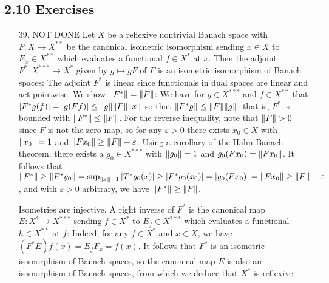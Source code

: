 \documentclass[11pt,leqno]{article}
\theoremstyle{plain}
\theoremstyle{definition}
\numberwithin{equation}{section}
\numberwithin{lem}{section}
\begin{document}
\subsection*{2.10 Exercises}
\begin{enumerate}
  \item[39. NOT DONE] Let $X$ be a reflexive nontrivial Banach space with $F\colon X\to X^{\ast\ast}$ be the canonical isometric isomorphism sending $x\in X$ to $E_x\in X^{\ast\ast}$ which evaluates a functional $f\in X^\ast$ at $x$. Then the adjoint $F^\ast\colon X^{\ast\ast\ast}\to X^\ast$ given by $g\mapsto gF$ of $F$ is an isometric isomorphism of Banach spaces: The adjoint $F^\ast$ is linear since functionals in dual spaces are linear and act pointwise. We show $\norm{F^\ast} = \norm{F}$: We have for $g\in X^{\ast\ast\ast}$ and $f\in X^{\ast\ast}$ that $\abs{F^\ast g(f)} = \abs{g(Ff)} \leq \norm{g}\norm{F}\norm{x}$ so that $\norm{F^\ast g}\leq \norm{F}\norm{g}$; that is, $F^\ast$ is bounded with $\norm{F^\ast}\leq \norm{F}$. For the reverse inequality, note that $\norm{F}>0$ since $F$ is not the zero map, so for any $\varepsilon>0$ there exists $x_0\in X$ with $\norm{x_0} = 1$ and $\norm{Fx_0}\geq \norm{F} - \varepsilon$. Using a corollary of the Hahn-Banach theorem, there exists a $g_0\in X^{\ast\ast\ast}$ with $\norm{g_0} = 1$ and $g_0(Fx_0) = \norm{Fx_0}$. It follows that $\norm{F^\ast}\geq \norm{F^\ast g_0} = \sup_{\norm{x} =1}\abs{T^\ast g_0(x)}\geq \abs{F^\ast g_0(x_0)} = \abs{g_0(Fx_0)} = \norm{Fx_0}\geq \norm{F} - \varepsilon$, and with $\varepsilon>0$ arbitrary, we have $\norm{F^\ast}\geq \norm{F}$.
  
  Isometries are injective. A right inverse of $F^\ast$ is the canonical map $E\colon X^\ast\to X^{\ast\ast\ast}$ sending $f\in X^\ast$ to $E_f\in X^{\ast\ast\ast}$ which evaluates a functional $h\in X^{\ast\ast}$ at $f$: Indeed, for any $f\in X^\ast$ and $x\in X$, we have $(F^\ast E)f(x) = E_fF_x = f(x)$. It follows that $F^\ast$ is an isometric isomorphism of Banach spaces, so the canonical map $E$ is also an isomorphism of Banach spaces, from which we deduce that $X^\ast$ is reflexive.


\end{enumerate}
\end{document}
